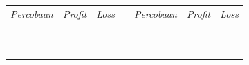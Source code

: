 \begin{table}[H]
  \centering
  \begin{tabular}{|c|c|l|l|l|l|l|}
  \cline{1-3} \cline{5-7}
  \textit{Percobaan}     & \textit{Profit}       & \textit{Loss} &  & \multicolumn{1}{c|}{\textit{Percobaan}} & \multicolumn{1}{c|}{\textit{Profit}} & \textit{Loss} \\ \cline{1-3} \cline{5-7} 
                         &                       &               &  &                                         &                                      &               \\ \cline{1-3} \cline{5-7} 
                         &                       &               &  &                                         &                                      &               \\ \cline{1-3} \cline{5-7} 
                         &                       &               &  &                                         &                                      &               \\ \cline{1-3} \cline{5-7} 
                         &                       &               &  &                                         &                                      &               \\ \cline{1-3} \cline{5-7} 
                         &                       &               &  &                                         &                                      &               \\ \cline{1-3} \cline{5-7} 
                         &                       &               &  &                                         &                                      &               \\ \cline{1-3} \cline{5-7} 
                         &                       &               &  &                                         &                                      &               \\ \cline{1-3} \cline{5-7} 
                         &                       &               &  &                                         &                                      &               \\ \cline{1-3} \cline{5-7} 
                         &                       &               &  &                                         &                                      &               \\ \cline{1-3} \cline{5-7} 
                         &                       &               &  &                                         &                                      &               \\ \cline{1-3} \cline{5-7} 

\end{tabular}
\end{table}
